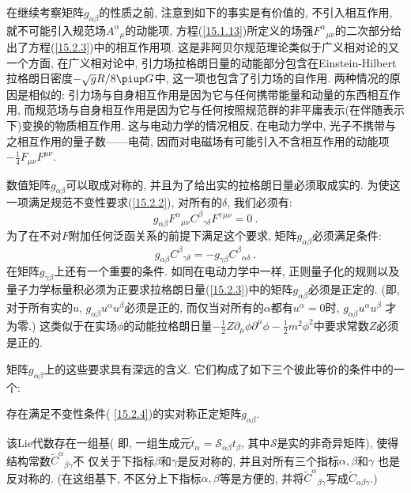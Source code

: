 在继续考察矩阵$g_{\alpha \beta }$的性质之前, 注意到如下的事实是有价值的, 不引入相互作用, 就不可能引入规范场$A^{\alpha }{}_{\mu }
$的动能项, 方程(\ref{15.1.13})所定义的场强$F^{\alpha}{}_{\mu \nu}$的二次部分给出了方程(\ref{15.2.3})中的相互作用项. 
这是非阿贝尔规范理论类似于广义相对论的又一个方面, 在广义相对论中,
引力场拉格朗日量的动能部分包含在Einstein-Hilbert拉格朗日密度${-}\sqrt{%
g}R/8\uppi G$中, 这一项也包含了引力场的自作用. 两种情况的原因是相似的:
引力场与自身相互作用是因为它与任何携带能量和动量的东西相互作用, 
而规范场与自身相互作用是因为它与任何按照规范群的非平庸表示(在伴随表示下)变换的物质相互作用. 这与电动力学的情况相反, 在电动力学中, 
光子不携带与之相互作用的量子数——电荷, 因而对电磁场有可能引入不含相互作用的动能项$-\frac{1}{4}F_{\mu \nu
}F^{\mu \nu }$.

数值矩阵$g_{\alpha \beta }$可以取成对称的, 并且为了给出实的拉格朗日量必须取成实的. 为使这一项满足规范不变性要求(\ref{15.2.2}), 
对所有的$\delta $, 我们必须有:%
\[
g_{\alpha \beta }F^{\alpha }{}_{\mu \nu }C^{\beta}{}_{\gamma\delta}F^{\gamma}{}^{\mu\nu}=0\:. 
\]%
为了在不对$F$附加任何泛函关系的前提下满足这个要求, 矩阵$g_{\alpha\beta }$必须满足条件:%
\begin{equation}
g_{\alpha \beta }C^{\beta}{}_{\gamma\delta}=-g_{\gamma \beta }C^{\beta}{}_{\alpha\delta}\:.   \label{15.2.4}
\end{equation}%
在矩阵$g_{\gamma \beta }$上还有一个重要的条件. 如同在电动力学中一样, 
正则量子化的规则以及量子力学标量积必须为正要求拉格朗日量(\ref{15.2.3})中的矩阵$g_{\alpha \beta }$必须是正定的.
(即, 对于所有实的$u$, $g_{\alpha\beta }u^{\alpha }u^{\beta }$必须是正的,
而仅当对所有的$\alpha $都有$u^{\alpha }=0$时, $g_{\alpha \beta }u^{\alpha }u^{\beta }$%
才为零.) 这类似于在实场$\phi $的动能拉格朗日量$-\frac{1}{2}Z\partial _{\mu }\phi \partial ^{\mu }\phi -\frac{1}{2}%
m^{2}\phi ^{2}$中要求常数$Z$必须是正的.

矩阵$g_{\alpha \beta }$上的这些要求具有深远的含义. 它们构成了如下三个彼此等价的条件中的一个:

 存在满足不变性条件(%
\ref{15.2.4})的实对称正定矩阵$g_{\alpha \beta }$.

 该Lie代数存在一组基(%
即, 一组生成元$\tilde{t}_{\alpha }=%
\mathscr{S}_{\alpha \beta }t_{\beta }$, 其中$\mathscr{S}$是实的非奇异矩阵), 使得结构常数$\tilde{C}^{\alpha }{}_{\beta\gamma}$不%
仅关于下指标$\beta $和$\gamma $是反对称的, 并且对所有三个指标$\alpha ,\beta $和$\gamma $%
也是反对称的. (在这组基下, 不区分上下指标$\alpha,\beta $等是方便的, 并将$\tilde{C}^{\alpha }%
{}_{\beta\gamma}$写成$\tilde{C}_{\alpha \beta \gamma }$.)

